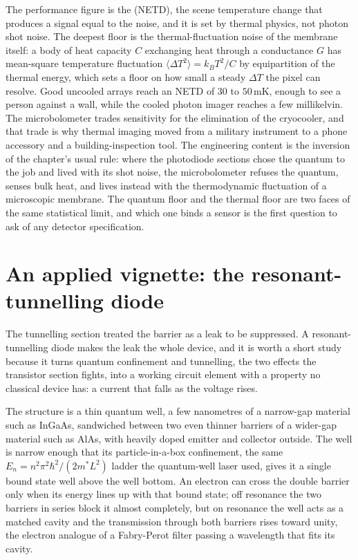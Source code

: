 The performance figure is the  (NETD), the scene temperature change that produces a signal
equal to the noise, and it is set by thermal physics, not photon shot
noise. The deepest floor is the thermal-fluctuation noise of the membrane
itself: a body of heat capacity $C$ exchanging heat through a conductance
$G$ has mean-square temperature fluctuation $\langle\Delta T^{2}\rangle =
k_B T^{2}/C$ by equipartition of the thermal energy, which sets a floor on
how small a steady $\Delta T$ the pixel can resolve. Good uncooled arrays
reach an NETD of $30$ to $50\,\si{\milli\kelvin}$, enough to see a person
against a wall, while the cooled photon imager reaches a few millikelvin.
The microbolometer trades sensitivity for the elimination of the
cryocooler, and that trade is why thermal imaging moved from a military
instrument to a phone accessory and a building-inspection tool. The
engineering content is the inversion of the chapter's usual rule: where the
photodiode sections chose the quantum to the job and lived with its shot
noise, the microbolometer refuses the quantum, senses bulk heat, and lives
instead with the thermodynamic fluctuation of a microscopic membrane. The
quantum floor and the thermal floor are two faces of the same statistical
limit, and which one binds a sensor is the first question to ask of any
detector specification.



\section{An applied vignette: the resonant-tunnelling diode}

The tunnelling section treated the barrier as a leak to be suppressed. A
resonant-tunnelling diode makes the leak the whole device, and it is worth a
short study because it turns quantum confinement and tunnelling, the two
effects the transistor section fights, into a working circuit element with a
property no classical device has: a current that falls as the voltage rises.

The structure is a thin quantum well, a few nanometres of a narrow-gap
material such as InGaAs, sandwiched between two even thinner barriers of a
wider-gap material such as AlAs, with heavily doped emitter and collector
outside. The well is narrow enough that its particle-in-a-box confinement,
the same $E_n = n^{2}\pi^{2}\hbar^{2}/(2m^{*}L^{2})$ ladder the quantum-well
laser used, gives it a single bound state well above the well bottom. An
electron can cross the double barrier only when its energy lines up with that
bound state; off resonance the two barriers in series block it almost
completely, but on resonance the well acts as a matched cavity and the
transmission through both barriers rises toward unity, the electron analogue
of a Fabry-Perot filter passing a wavelength that fits its cavity.

